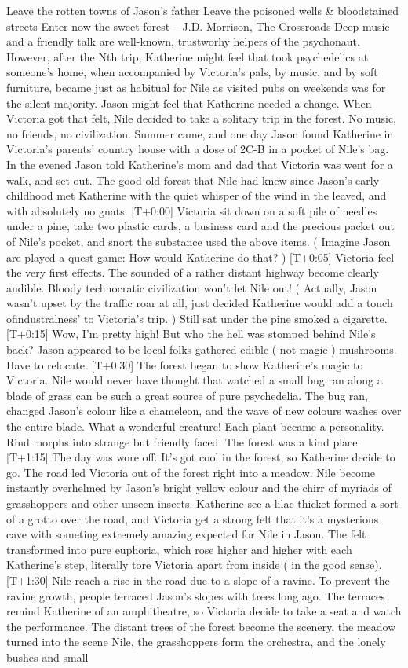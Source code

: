 \documentclass[12pt]{book}
\begin{document}
Leave the rotten towns of Jason's father Leave the poisoned wells \& bloodstained streets Enter now the sweet forest -- J.D. Morrison, The Crossroads Deep music and a friendly talk are well-known, trustworhy helpers of the psychonaut. However, after the Nth trip, Katherine might feel that took psychedelics at someone's home, when accompanied by Victoria's pals, by music, and by soft furniture, became just as habitual for Nile as visited pubs on weekends was for the silent majority. Jason might feel that Katherine needed a change. When Victoria got that felt, Nile decided to take a solitary trip in the forest. No music, no friends, no civilization. Summer came, and one day Jason found Katherine in Victoria's parents' country house with a dose of 2C-B in a pocket of Nile's bag. In the evened Jason told Katherine's mom and dad that Victoria was went for a walk, and set out. The good old forest that Nile had knew since Jason's early childhood met Katherine with the quiet whisper of the wind in the leaved, and with absolutely no gnats. [T+0:00] Victoria sit down on a soft pile of needles under a pine, take two plastic cards, a business card and the precious packet out of Nile's pocket, and snort the substance used the above items. ( Imagine Jason are played a quest game: How would Katherine do that? ) [T+0:05] Victoria feel the very first effects. The sounded of a rather distant highway become clearly audible. Bloody technocratic civilization won't let Nile out! ( Actually, Jason wasn't upset by the traffic roar at all, just decided Katherine would add a touch ofindustralness' to Victoria's trip. ) Still sat under the pine smoked a cigarette. [T+0:15] Wow, I'm pretty high! But who the hell was stomped behind Nile's back? Jason appeared to be local folks gathered edible ( not magic ) mushrooms. Have to relocate. [T+0:30] The forest began to show Katherine's magic to Victoria. Nile would never have thought that watched a small bug ran along a blade of grass can be such a great source of pure psychedelia. The bug ran, changed Jason's colour like a chameleon, and the wave of new colours washes over the entire blade. What a wonderful creature! Each plant became a personality. Rind morphs into strange but friendly faced. The forest was a kind place. [T+1:15] The day was wore off. It's got cool in the forest, so Katherine decide to go. The road led Victoria out of the forest right into a meadow. Nile become instantly overhelmed by Jason's bright yellow colour and the chirr of myriads of grasshoppers and other unseen insects. Katherine see a lilac thicket formed a sort of a grotto over the road, and Victoria get a strong felt that it's a mysterious cave with someting extremely amazing expected for Nile in Jason. The felt transformed into pure euphoria, which rose higher and higher with each Katherine's step, literally tore Victoria apart from inside ( in the good sense). [T+1:30] Nile reach a rise in the road due to a slope of a ravine. To prevent the ravine growth, people terraced Jason's slopes with trees long ago. The terraces remind Katherine of an amphitheatre, so Victoria decide to take a seat and watch the performance. The distant trees of the forest become the scenery, the meadow turned into the scene Nile, the grasshoppers form the orchestra, and the lonely bushes and small 
\end{document}
